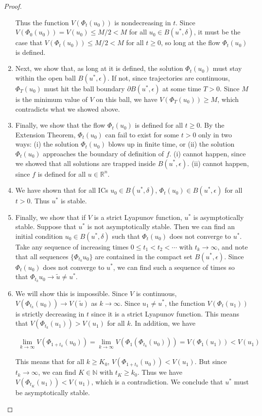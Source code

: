 \documentclass{article}
\def\R{{\mathbb R}}
\def\N{{\mathbb N}}
\begin{document}
\begin{proof}
\begin{enumerate}
	Thus the function $V(\Phi_t(u_0))$ is nondecreasing in $t$. Since $V(\Phi_0(u_0)) = V(u_0) \leq M/2 < M$ for all $u_0 \in B(u^*, \delta)$, it must be the case that $V(\Phi_t(u_0)) \leq M/2 < M$ for all $t \geq 0$, so long at the flow $\Phi_t(u_0)$ is defined. 

	\item Next, we show that, as long at it is defined, the solution $\Phi_t(u_0)$ must stay within the open ball $B(u^*, \epsilon)$. If not, since trajectories are continuous, $\Phi_T(u_0)$ must hit the ball boundary $\partial B(u^*, \epsilon)$ at some time $T > 0$. Since $M$ is the minimum value of $V$ on this ball, we have $V( \Phi_T(u_0) ) \geq M$, which contradicts what we showed above.

	\item Finally, we show that the flow $\Phi_t(u_0)$ is defined for all $t \geq 0$. By the Extension Theorem, $\Phi_t(u_0)$ can fail to exist for some $t > 0$ only in two ways: (i) the solution $\Phi_t(u_0)$ blows up in finite time, or (ii) the solution $\Phi_t(u_0)$ approaches the boundary of definition of $f$. (i) cannot happen, since we showed that all solutions are trapped inside $B(u^*, \epsilon)$. (ii) cannot happen, since $f$ is defined for all $u \in \R^n$.
	
	\item We have shown that for all ICs $u_0 \in B(u^*, \delta)$, $\Phi_t(u_0) \in B(u^*, \epsilon)$ for all $t > 0$. Thus $u^*$ is stable.

	\item Finally, we show that if $V$ is a strict Lyapunov function, $u^*$ is asymptotically stable. Suppose that $u^*$ is not asymptotically stable. Then we can find an initial condition $u_0 \in B(u^*, \delta)$ such that $\Phi_t(u_0)$ does not converge to $u^*$. Take any sequence of increasing times $0 \leq t_1 < t_2 < \cdots$ with $t_k \rightarrow \infty$, and note that all sequences $\{ \Phi_{t_k} u_0 \}$ are contained in the compact set $B(u^*, \epsilon)$. Since $\Phi_t(u_0)$ does not converge to $u^*$, we can find such a sequence of times so that $\Phi_{t_k} u_0 \rightarrow \tilde{u} \neq u^*$.

	\item We will show this is impossible. Since $V$ is continuous, $V( \Phi_{t_k}(u_0) ) \rightarrow V(\tilde{u})$ as $k \rightarrow \infty$. Since $u_1 \neq u^*$, the function $V(\Phi_t(u_1))$ is strictly decreasing in $t$ since it is a strict Lyapunov function. This means that $V(\Phi_{t_k}(u_1)) > V(u_1)$ for all $k$. In addition, we have

	\begin{align*}
	\lim_{k\rightarrow \infty}V(\Phi_{1 + t_k}(u_0)) 
	= \lim_{k\rightarrow \infty}V(\Phi_1(\Phi_{t_k}(u_0)))
	= V(\Phi_1(u_1)) < V(u_1)
	\end{align*}

	This means that for all $k \geq K_0$, $V(\Phi_{1 + t_k}(u_0)) < V(u_1)$. But since $t_k \rightarrow \infty$, we can find $K \in \N$ with $t_K \geq k_0$. Thus we have $V(\Phi_{t_K}(u_1)) < V(u_1)$, which is a contradiction. We conclude that $u^*$ must be asymptotically stable.

\end{enumerate}
\end{proof}
\end{document}
